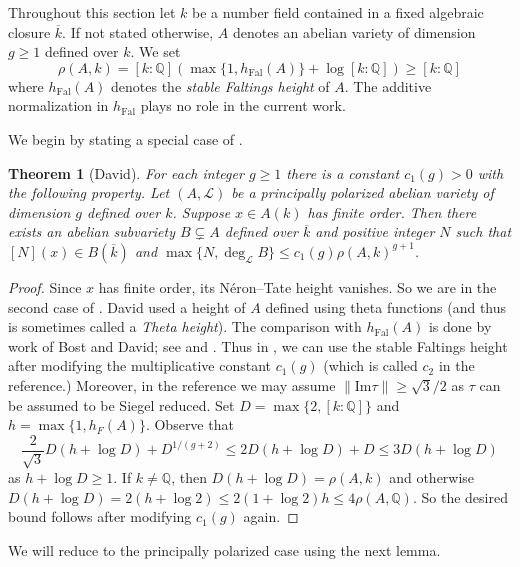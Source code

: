 \documentclass[12pt,oneside]{amsart}
\newcounter{maincounter}
\numberwithin{maincounter}{section}
\numberwithin{equation}{section}
\newtheorem{theorem}[maincounter]{Theorem}
\def\QQ{\mathbb{Q}}
\newcommand{\IQ}{{\QQ}}
\newcommand{\cL}{{\mathcal L}}
\begin{document}
Throughout this section let $k$ be a number field contained in a fixed algebraic closure
$\overline k$. 
If not stated otherwise,  $A$ denotes
an abelian variety of dimension $g\ge 1$  defined over  $k$. We set
\[
  \rho(A,k) = 
  [k:\IQ](\max\{1,h_{\mathrm{Fal}}(A)\}+\log [k:\IQ])\ge [k:\IQ]%
\]
where
$h_{\mathrm{Fal}}(A)$ denotes the \textit{stable Faltings height} of
$A$. The additive normalization in $h_{\mathrm{Fal}}$ plays no role in
the current work.

We begin by stating a special case of \cite[Th\'eor\`eme 1.4]{DavidMinHaut}. 

\begin{theorem}[David]
  \label{thm:david}
  For each integer $g\ge 1$  there is a constant $c_1(g)>0$
  with the following property. 
  Let $(A,\cL)$ be
  a principally polarized abelian variety of dimension $g$
  defined over $k$. Suppose $x\in A(k)$
  has finite order. Then there exists an abelian subvariety
  $B\subsetneq A$ defined over $\overline k$ and  positive integer $N$ such that
  $[N](x)\in B(\overline k)$ and  $\max\{N,\deg_\cL B\} \le c_1(g) \rho(A,k)^{g+1}$.
\end{theorem}
\begin{proof}
  Since $x$ has finite order, its N\'eron--Tate height vanishes. So we
  are in the second case of \cite[Theorem~1.4]{DavidMinHaut}.
  David used a height of $A$ defined using theta functions
  (and thus is sometimes called a \textit{Theta height}). The comparison
  with  $h_{\mathrm{Fal}}(A)$ is done
  by work of Bost and David; see \cite[Corollaire~6.9]{DPvarabII} and
  \cite[Corollary~1.3]{Pazuki:12}. Thus in \cite[Th\'eor\`eme~1.4]{DavidMinHaut}, we can use the stable Faltings height after
  modifying the multiplicative constant $c_1(g)$ (which is called $c_2$
  in the reference.)
  Moreover, in the reference we  may assume $\|\mathrm{Im}\tau\|\ge
  \sqrt{3}/2$ as $\tau$ can be assumed to be Siegel reduced.
  Set $D = \max\{2,[k:\IQ]\}$ and $h = \max\{1,h_F(A)\}$. 
  Observe that
  $$
  \frac{2}{\sqrt 3} D(h+\log D) + D^{1/(g+2)} \le 2 D(h+\log D) + D\le
  3 D(h+\log D)
  $$
  as $h+\log D\ge 1$. If $k\not=\IQ$, then $D(h+\log D) = \rho(A,k)$
  and otherwise $D(h+\log D) = 2(h+\log 2) \le 2(1+\log 2) h \le 4 \rho(A,\IQ)$. 
  So the desired bound follows after
  modifying $c_1(g)$ again.
\end{proof}

We will reduce to the principally polarized case using the next lemma.

\end{document}
